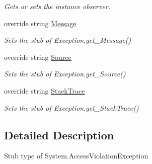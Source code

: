 \begin{DoxyCompactItemize}
\begin{DoxyCompactList}\small\item\em Gets or sets the instance observer.\end{DoxyCompactList}\item 
override string \hyperlink{class_system_1_1_fakes_1_1_stub_access_violation_exception_a2d838945cede923b572314528ab0b487}{Message}
\begin{DoxyCompactList}\small\item\em Sets the stub of Exception.\-get\-\_\-\-Message()\end{DoxyCompactList}\item 
override string \hyperlink{class_system_1_1_fakes_1_1_stub_access_violation_exception_aeb416417305c2c68d704aef1ebb15d59}{Source}
\begin{DoxyCompactList}\small\item\em Sets the stub of Exception.\-get\-\_\-\-Source()\end{DoxyCompactList}\item 
override string \hyperlink{class_system_1_1_fakes_1_1_stub_access_violation_exception_a915a1f7ed2ef7b3ff3a280a5ef5d2478}{Stack\-Trace}
\begin{DoxyCompactList}\small\item\em Sets the stub of Exception.\-get\-\_\-\-Stack\-Trace()\end{DoxyCompactList}\end{DoxyCompactItemize}


\subsection{Detailed Description}
Stub type of System.\-Access\-Violation\-Exception



